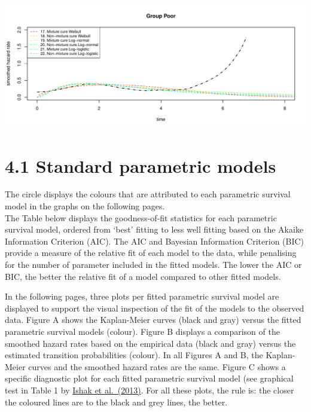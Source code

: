 \documentclass[
]{article}
\begin{document}
\begin{flushleft}\includegraphics[height=0.29\textheight]{Images/plot_haz_pred-9} \end{flushleft}

\clearpage

\hypertarget{standard-parametric-models}{%
\section{4.1 Standard parametric
models}\label{standard-parametric-models}}

The circle displays the colours that are attributed to each parametric
survival model in the graphs on the following pages.\\
The Table below displays the goodness-of-fit statistics for each
parametric survival model, ordered from `best' fitting to less well
fitting based on the Akaike Information Criterion (AIC). The AIC and
Bayesian Information Criterion (BIC) provide a measure of the relative
fit of each model to the data, while penalising for the number of
parameter included in the fitted models. The lower the AIC or BIC, the
better the relative fit of a model compared to other fitted models.

In the following pages, three plots per fitted parametric survival model
are displayed to support the visual inspection of the fit of the models
to the observed data. Figure A shows the Kaplan-Meier curves (black and
gray) versus the fitted parametric survival models (colour). Figure B
displays a comparison of the smoothed hazard rates based on the
empirical data (black and gray) versus the estimated transition
probabilities (colour). In all Figures A and B, the Kaplan-Meier curves
and the smoothed hazard rates are the same. Figure C shows a specific
diagnostic plot for each fitted parametric survival model (see graphical
test in Table 1 by
\href{https://doi.org/10.1007/s40273-013-0064-3}{Ishak et al.~(2013)}.
For all these plots, the rule is: the closer the coloured lines are to
the black and grey lines, the better.
\end{document}
